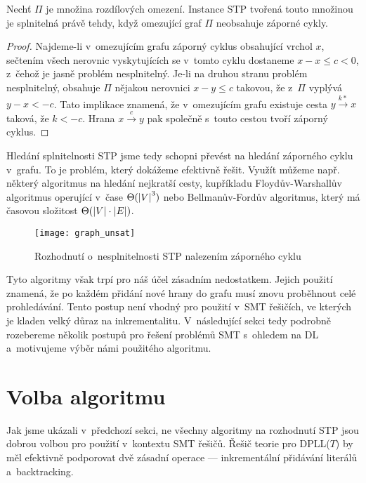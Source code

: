 \begin{tvrz}
	Nechť $\Pi$ je množina rozdílových omezení. Instance STP tvořená touto množinou je splnitelná právě tehdy, když omezující graf $\Pi$ neobsahuje záporné cykly.
\end{tvrz}
\begin{proof}
	Najdeme-li v~omezujícím grafu záporný cyklus obsahující vrchol $x$, sečtením všech nerovnic vyskytujících se v~tomto cyklu dostaneme $x-x \leq c < 0$, z~čehož je jasně problém nesplnitelný. Je-li na druhou stranu problém nesplnitelný, obsahuje $\Pi$ nějakou nerovnici $x - y \leq c$ takovou, že z~$\Pi$ vyplývá $y - x < -c$. Tato implikace znamená, že v~omezujícím grafu existuje cesta $y \xrightarrow{k*} x$ taková, že $k < -c$. Hrana $x \xrightarrow{c} y$ pak společně s~touto cestou tvoří záporný cyklus.
\end{proof}

Hledání splnitelnosti STP jsme tedy schopni převést na hledání záporného cyklu v~grafu. To je problém, který dokážeme efektivně řešit. Využít můžeme např. některý algoritmus na hledání nejkratší cesty, kupříkladu Floydův-Warshallův algoritmus operující v~čase $\Theta(\left|{V}\right|^3)$ nebo Bellmanův-Fordův algoritmus, který má časovou složitost $\Theta(\left|{V}\right|\cdot\left|{E}\right|)$.

\begin{figure}
	\centering
	\texttt{[image: graph\_unsat]}
	\caption{Rozhodnutí o~nesplnitelnosti STP nalezením záporného cyklu}
\end{figure}

Tyto algoritmy však trpí pro náš účel zásadním nedostatkem. Jejich použití znamená, že po každém přidání nové hrany do grafu musí znovu proběhnout celé prohledávání. Tento postup není vhodný pro použití v~SMT řešičích, ve kterých je kladen velký důraz na inkrementalitu. V~následující sekci tedy podrobně rozebereme několik postupů pro řešení problémů SMT s~ohledem na DL a~motivujeme výběr námi použitého algoritmu. 

\section{Volba algoritmu}\label{alg}

Jak jsme ukázali v~předchozí sekci, ne všechny algoritmy na rozhodnutí STP jsou dobrou volbou pro použití v~kontextu SMT řešičů. Řešič teorie pro DPLL($T$) by měl efektivně podporovat dvě zásadní operace --- inkrementální přidávání literálů a~backtracking.


